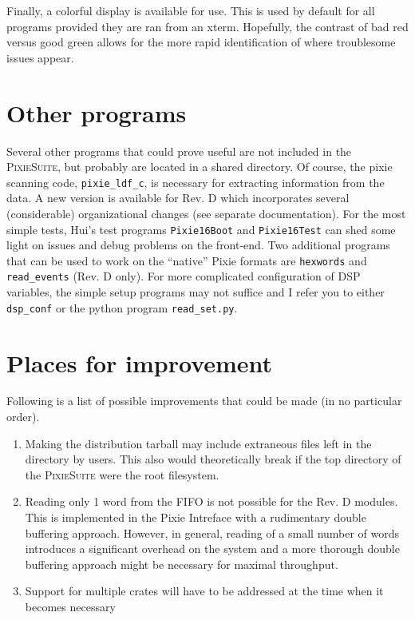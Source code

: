 \documentclass{article}
\begin{document}
Finally, a colorful display is available for use. This is used by default for all programs provided they are ran from an xterm. Hopefully, the contrast of bad red versus good green allows for the more rapid identification of where troublesome issues appear.
\section{Other programs}
Several other programs that could prove useful are not included in the \textsc{PixieSuite}, but probably are located in a shared directory. Of course, the pixie scanning code, \texttt{pixie\_ldf\_c}, is necessary for extracting information from the data. A new version is available for Rev. D which incorporates several (considerable) organizational changes (see separate documentation). For the most simple tests, Hui's test programs \texttt{Pixie16Boot} and \texttt{Pixie16Test} can shed some light on issues and debug problems on the front-end. Two additional programs that can be used to work on the ``native'' Pixie formats are \texttt{hexwords} and \texttt{read\_events} (Rev. D only). For more complicated configuration of DSP variables, the simple setup programs may not suffice and I refer you to either \texttt{dsp\_conf} or the python program \texttt{read\_set.py}.

\section{Places for improvement}
Following is a list of possible improvements that could be made (in no particular order).
\begin{enumerate}
\item Making the distribution tarball may include extraneous files left in the directory by users. This also would theoretically break if the top directory of the \textsc{PixieSuite} were the root filesystem.
\item Reading only 1 word from the FIFO is not possible for the Rev. D modules. This is implemented in the Pixie Intreface with a rudimentary double buffering approach. However, in general, reading of a small number of words introduces a significant overhead on the system and a more thorough double buffering approach might be necessary for maximal throughput.
\item Support for multiple crates will have to be addressed at the time when it becomes necessary
\end{enumerate}
\end{document}
